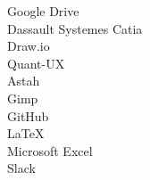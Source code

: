 \begin{description}
    \item[Google Drive]
    \item[Dassault Systemes Catia]
    \item[Draw.io]
    \item[Quant-UX]
    \item[Astah]
    \item[Gimp]
    \item[GitHub]
    \item[LaTeX]
    \item[Microsoft Excel]
    \item[Slack]
\end{description}

